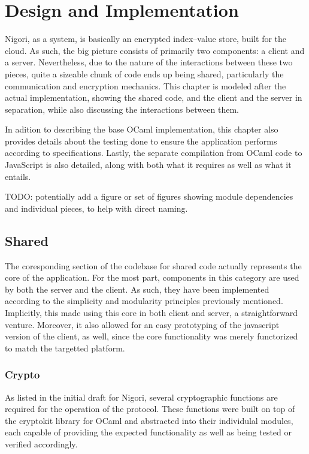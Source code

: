 \chapter{Design and Implementation}
Nigori, as a system, is basically an encrypted index--value store, built for the cloud.
As such, the big picture consists of primarily two components: a client and a server.
Nevertheless, due to the nature of the interactions between these two pieces, quite a sizeable chunk of code ends up being shared, particularly the communication and encryption mechanics.
This chapter is modeled after the actual implementation, showing the shared code, and the client and the server in separation, while also discussing the interactions between them.

In adition to describing the base OCaml implementation, this chapter also provides details about the testing done to ensure the application performs according to specifications.
Lastly, the separate compilation from OCaml code to JavaScript is also detailed, along with both what it requires as well as what it entails.

TODO: potentially add a figure or set of figures showing module dependencies and individual pieces, to help with direct naming.

\section{Shared}
The coresponding section of the codebase for shared code actually represents the core of the application.
For the most part, components in this category are used by both the server and the client.
As such, they have been implemented according to the simplicity and modularity principles previously mentioned.
Implicitly, this made using this core in both client and server, a straightforward venture.
Moreover, it also allowed for an easy prototyping of the javascript version of the client, as well, since the core functionality was merely functorized to match the targetted platform.

\subsection{Crypto}
As listed in the initial draft for Nigori, several cryptographic functions are required for the operation of the protocol.
These functions were built on top of the cryptokit library for OCaml and abstracted into their individulal modules, each capable of providing the expected functionality as well as being tested or verified accordingly.

